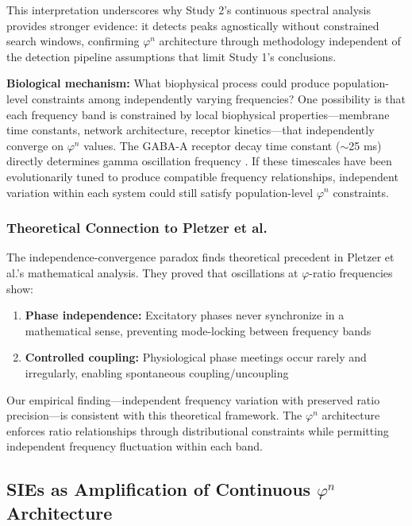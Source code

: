 \documentclass[11pt,a4paper]{article}
\newcommand{\phisym}{\varphi}
\begin{document}
This interpretation underscores why Study 2's continuous spectral analysis provides stronger evidence: it detects peaks agnostically without constrained search windows, confirming $\phisym^n$ architecture through methodology independent of the detection pipeline assumptions that limit Study 1's conclusions.

\textbf{Biological mechanism:} What biophysical process could produce population-level constraints among independently varying frequencies? One possibility is that each frequency band is constrained by local biophysical properties---membrane time constants, network architecture, receptor kinetics---that independently converge on $\phisym^n$ values. The GABA-A receptor decay time constant ($\sim$25 ms) directly determines gamma oscillation frequency \parencite{bartos2007synaptic}. If these timescales have been evolutionarily tuned to produce compatible frequency relationships, independent variation within each system could still satisfy population-level $\phisym^n$ constraints.

\subsubsection{Theoretical Connection to Pletzer et al.}

The independence-convergence paradox finds theoretical precedent in Pletzer et al.'s \parencite{pletzer2010golden} mathematical analysis. They proved that oscillations at $\phisym$-ratio frequencies show:
\begin{enumerate}
    \item \textbf{Phase independence:} Excitatory phases never synchronize in a mathematical sense, preventing mode-locking between frequency bands
    \item \textbf{Controlled coupling:} Physiological phase meetings occur rarely and irregularly, enabling spontaneous coupling/uncoupling
\end{enumerate}

Our empirical finding---independent frequency variation with preserved ratio precision---is consistent with this theoretical framework. The $\phisym^n$ architecture enforces ratio relationships through distributional constraints while permitting independent frequency fluctuation within each band.

\subsection{SIEs as Amplification of Continuous $\phisym^n$ Architecture}
\end{document}
